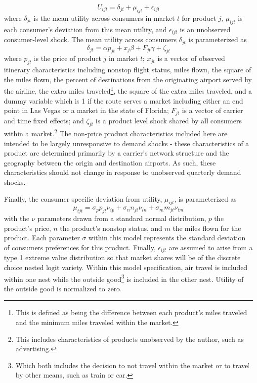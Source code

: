 \documentclass{article}
\begin{document}
	\[U_{ijt} = \delta_{jt} + \mu_{ijt} + \epsilon_{ijt}\] where $\delta_{jt}$ is the mean utility across consumers in market $t$ for product $j$, $\mu_{ijt}$ is each consumer's deviation from this mean utility, and $\epsilon_{ijt}$ is an unobserved consumer-level shock. The mean utility across consumers $\delta_{jt}$ is parameterized as \[\delta_{jt} = \alpha p_{jt} + x_{j} \beta + F_{jt}\gamma  +  \zeta_{jt}\] where $p_{jt}$ is the price of product $j$ in market $t$; $x_{jt}$ is a vector of observed itinerary characteristics including nonstop flight status, miles flown, the square of the miles flown, the percent of destinations from the originating airport served by the airline, the extra miles traveled\footnote{This is defined as being the difference between each product's miles traveled and the minimum miles traveled within the market.}, the square of the extra miles traveled, and a dummy variable which is 1 if the route serves a market including either an end point in Las Vegas or a market in the state of Florida; $F_{jt}$ is a vector of carrier and time fixed effects; and $\zeta_{jt}$ is a product level shock shared by all consumers within a market.\footnote{This includes characteristics of products unobserved by the author, such as advertising.} The non-price product characteristics included here are intended to be largely unresponsive to demand shocks - these characteristics of a product are determined primarily by a carrier's network structure and the geography between the origin and destination airports. As such, these characteristics should not change in response to unobserved quarterly demand shocks.
	 
    Finally, the consumer specific deviation from utility, $\mu_{ijt}$, is parameterized as \[\mu_{ijt} = \sigma_{p} p_{jt} \nu_{ip} + \sigma_{n} n_{jt} \nu_{in} + \sigma_{m} m_{jt} \nu_{im} \] with the $\nu$ parameters drawn from a standard normal distribution, $p$ the product's price, $n$ the product's nonstop status, and $m$ the miles flown for the product. Each parameter $\sigma$ within this model represents the standard deviation of consumers preferences for this product.  Finally, $\epsilon_{ijt}$ are assumed to arise from a type 1 extreme value distribution so that market shares will be of the discrete choice nested logit variety. Within this model specification, air travel is included within one nest while the outside good\footnote{Which both includes the decision to not travel within the market or to travel by other means, such as train or car.} is included in the other nest. Utility of the outside good is normalized to zero. 
	
\end{document}
